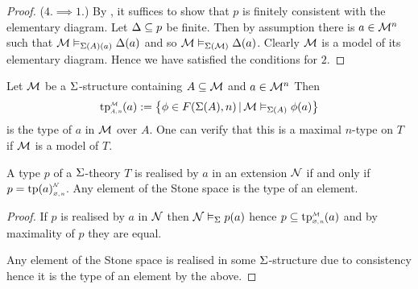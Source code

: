 \begin{proof}
    ($4. \implies 1.$)
        By ,
        it suffices to show that $p$ 
        is finitely consistent with the elementary diagram.
        Let $\Delta \subseteq p$ be finite.
        Then by assumption there is $a \in {\mathcal{M}}^n$ such that 
        $\mathcal{M} \vDash_{\Sigma(A)(a)} \Delta(a)$ and so $\mathcal{M} \vDash_{\Sigma(\mathcal{M})} \Delta(a)$.
        Clearly $\mathcal{M}$ is a model of its elementary diagram.
        Hence we have satisfied the conditions for $2$.
\end{proof}

\begin{dfn}
    Let $\mathcal{M}$ be a $\Sigma$-structure containing
    $A \subseteq {\mathcal{M}}$ and $a \in {\mathcal{M}}^n$
    Then 
    \[\subintp{A,n}{\MM}{\tp}(a) := 
    \set{\phi \in F(\Si(A),n) \st \MM \model{\Si(A)} \phi(a)}\]
    is the type of $a$ in $\mathcal{M}$ over $A$.
    One can verify that this is a maximal $n$-type on $T$
    if $\mathcal{M}$ is a model of $T$.
\end{dfn}

\begin{prop}
    A type $p$ of a $\Sigma$-theory $T$ 
    is realised by $a$ in an extension $\mathcal{N}$ if and only if 
    $p = \subintp{\nothing,n}{\NN}{\tp(a)}$.
    Any element of the Stone space is the type of an element.
\end{prop}
\begin{proof}
    If $p$ is realised by $a$ in $\mathcal{N}$ then 
    $\mathcal{N} \vDash_{\Sigma} p(a)$ hence $p \subs \subintp{\nothing,n}{\MM}{\tp}(a)$
    and by maximality of $p$ they are equal.

    Any element of the Stone space is realised in some 
    $\Sigma$-structure due to consistency
    hence it is the type of an element by the above.
\end{proof}

